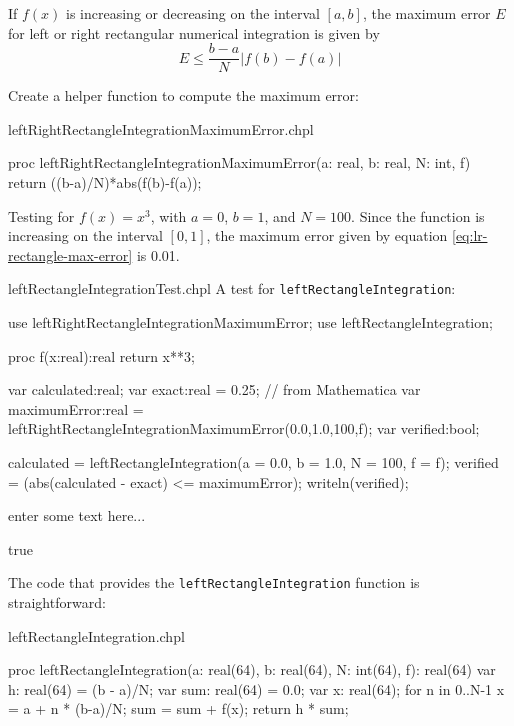 If $f(x)$ is increasing or decreasing on the interval $[a,b]$, the maximum error $E$ 
for left or right rectangular numerical integration is given by
\begin{equation}
E \leq \frac{b-a}{N}\left|f(b)-f(a)\right| \label{eq:lr-rectangle-max-error}
\end{equation}

Create a helper function to compute the maximum error:
\begin{chapelexample}{leftRightRectangleIntegrationMaximumError.chpl}
\begin{chapel}
proc leftRightRectangleIntegrationMaximumError(a: real, b: real, N: int, f){
  return ((b-a)/N)*abs(f(b)-f(a));
}
\end{chapel}
\end{chapelexample}

Testing for $f(x) = x^3$, with $a=0$, $b=1$, and $N=100$.
Since the function is increasing on the interval $[0,1]$, 
the maximum error given by equation \ref{eq:lr-rectangle-max-error} is 0.01.


\begin{chapelexample}{leftRectangleIntegrationTest.chpl}
A test for \lstinline{leftRectangleIntegration}:
\begin{chapelpre}
use leftRightRectangleIntegrationMaximumError;
use leftRectangleIntegration;
\end{chapelpre}
\begin{chapel}
proc f(x:real):real {
  return x**3;
} 
  
var calculated:real;
var exact:real = 0.25;  // from Mathematica
var maximumError:real = leftRightRectangleIntegrationMaximumError(0.0,1.0,100,f);
var verified:bool;

calculated = leftRectangleIntegration(a = 0.0, b = 1.0, N = 100, f = f);
verified = (abs(calculated - exact) <= maximumError);
writeln(verified);
\end{chapel}
enter some text here...
\begin{chapelpost}
\end{chapelpost}
\begin{chapeloutput}
true
\end{chapeloutput}
\end{chapelexample}

The code that provides the \lstinline{leftRectangleIntegration} function is straightforward:
\begin{chapelsource}{leftRectangleIntegration.chpl}
\begin{chapel}
proc leftRectangleIntegration(a: real(64), b: real(64), N: int(64), f): real(64){
  var h: real(64) = (b - a)/N;
  var sum: real(64) = 0.0;
  var x: real(64);
  for n in 0..N-1 {
    x = a + n * (b-a)/N;
    sum = sum + f(x);
  }
  return h * sum;
}
\end{chapel}
\end{chapelsource}

